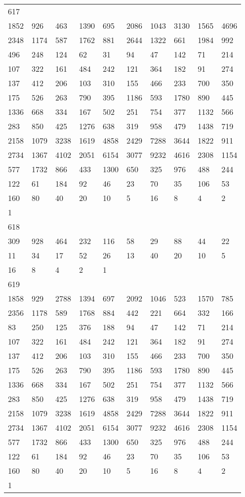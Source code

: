 \begin{longtable}{*{10}{l}}
617&&&&&&&&&\\
1852& 926& 463& 1390& 695& 2086& 1043& 3130& 1565& 4696\\
2348& 1174& 587& 1762& 881& 2644& 1322& 661& 1984& 992\\
496& 248& 124& 62& 31& 94& 47& 142& 71& 214\\
107& 322& 161& 484& 242& 121& 364& 182& 91& 274\\
137& 412& 206& 103& 310& 155& 466& 233& 700& 350\\
175& 526& 263& 790& 395& 1186& 593& 1780& 890& 445\\
1336& 668& 334& 167& 502& 251& 754& 377& 1132& 566\\
283& 850& 425& 1276& 638& 319& 958& 479& 1438& 719\\
2158& 1079& 3238& 1619& 4858& 2429& 7288& 3644& 1822& 911\\
2734& 1367& 4102& 2051& 6154& 3077& 9232& 4616& 2308& 1154\\
577& 1732& 866& 433& 1300& 650& 325& 976& 488& 244\\
122& 61& 184& 92& 46& 23& 70& 35& 106& 53\\
160& 80& 40& 20& 10& 5& 16& 8& 4& 2\\
1& \\

618&&&&&&&&&\\
309& 928& 464& 232& 116& 58& 29& 88& 44& 22\\
11& 34& 17& 52& 26& 13& 40& 20& 10& 5\\
16& 8& 4& 2& 1& \\

619&&&&&&&&&\\
1858& 929& 2788& 1394& 697& 2092& 1046& 523& 1570& 785\\
2356& 1178& 589& 1768& 884& 442& 221& 664& 332& 166\\
83& 250& 125& 376& 188& 94& 47& 142& 71& 214\\
107& 322& 161& 484& 242& 121& 364& 182& 91& 274\\
137& 412& 206& 103& 310& 155& 466& 233& 700& 350\\
175& 526& 263& 790& 395& 1186& 593& 1780& 890& 445\\
1336& 668& 334& 167& 502& 251& 754& 377& 1132& 566\\
283& 850& 425& 1276& 638& 319& 958& 479& 1438& 719\\
2158& 1079& 3238& 1619& 4858& 2429& 7288& 3644& 1822& 911\\
2734& 1367& 4102& 2051& 6154& 3077& 9232& 4616& 2308& 1154\\
577& 1732& 866& 433& 1300& 650& 325& 976& 488& 244\\
122& 61& 184& 92& 46& 23& 70& 35& 106& 53\\
160& 80& 40& 20& 10& 5& 16& 8& 4& 2\\
1& \\


\end{longtable}
